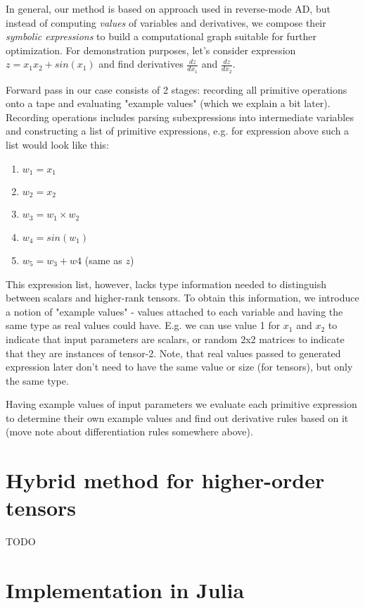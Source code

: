 \documentclass[conference]{IEEEtran}
\begin{document}
In general, our method is based on approach used in reverse-mode AD, but instead of computing \textit{values} of variables and derivatives, we compose their \textit{symbolic expressions} to build a computational graph suitable for further optimization. For demonstration purposes, let's consider expression $z = x_1x_2 + sin(x_1)$ and find derivatives $\frac{dz}{dx_1}$ and $\frac{dz}{dx_2}$.

Forward pass in our case consists of 2 stages: recording all primitive operations onto a tape and evaluating "example values" (which we explain a bit later). Recording operations includes parsing subexpressions into intermediate variables and constructing a list of primitive expressions, e.g. for expression above such a list would look like this:

\begin{enumerate}
\item $w_1 = x_1$
\item $w_2 = x_2$
\item $w_3 = w_1 \times w_2$
\item $w_4 = sin(w_1)$
\item $w_5 = w_3 + w4$ (same as $z$)
\end{enumerate}

This expression list, however, lacks type information needed to distinguish between scalars and higher-rank tensors. To obtain this information, we introduce a notion of "example values" - values attached to each variable and having the same type as real values could have. E.g. we can use value 1 for $x_1$ and $x_2$ to indicate that input parameters are scalars, or random 2x2 matrices to indicate that they are instances of tensor-2. Note, that real values passed to generated expression later don't need to have the same value or size (for tensors), but only the same type. 

Having example values of input parameters we evaluate each primitive expression to determine their own example values and find out derivative rules based on it (move note about differentiation rules somewhere above).


\section{Hybrid method for higher-order tensors}

TODO

\section{Implementation in Julia}
\end{document}
